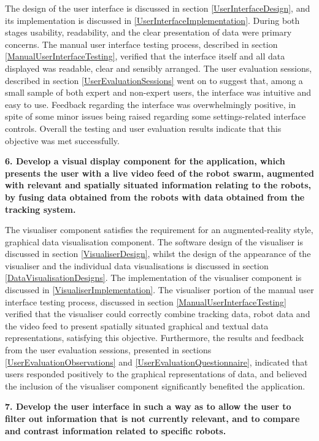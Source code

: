 The design of the user interface is discussed in section \ref{UserInterfaceDesign}, and its implementation is discussed in \ref{UserInterfaceImplementation}. During both stages usability, readability, and the clear presentation of data were primary concerns. The manual user interface testing process, described in section \ref{ManualUserInterfaceTesting}, verified that the interface itself and all data displayed was readable, clear and sensibly arranged. The user evaluation sessions, described in section \ref{UserEvaluationSessions} went on to suggest that, among a small sample of both expert and non-expert users, the interface was intuitive and easy to use. Feedback regarding the interface was overwhelmingly positive, in spite of some minor issues being raised regarding some settings-related interface controls. Overall the testing and user evaluation results indicate that this objective was met successfully.

\noindent \textbf{6. Develop a visual display component for the application, which presents the user with a live video feed of the robot swarm, augmented with relevant and spatially situated information relating to the robots, by fusing data obtained from the robots with data obtained from the tracking system.}

The visualiser component satisfies the requirement for an augmented-reality style, graphical data visualisation component. The software design of the visualiser is discussed in section \ref{VisualiserDesign}, whilst the design of the appearance of the visualiser and the individual data visualisations is discussed in section \ref{DataVisualisationDesigns}. The implementation of the visualiser component is discussed in \ref{VisualiserImplementation}. The visualiser portion of the manual user interface testing process, discussed in section \ref{ManualUserInterfaceTesting} verified that the visualiser could correctly combine tracking data, robot data and the video feed to present spatially situated graphical and textual data representations, satisfying this objective. Furthermore, the results and feedback from the user evaluation sessions, presented in sections \ref{UserEvaluationObservations} and \ref{UserEvaluationQuestionnaire}, indicated that users responded positively to the graphical representations of data, and believed the inclusion of the visualiser component significantly benefited the application.

\noindent \textbf{7. Develop the user interface in such a way as to allow the user to filter out information that is not currently relevant, and to compare and contrast information related to specific robots.}

